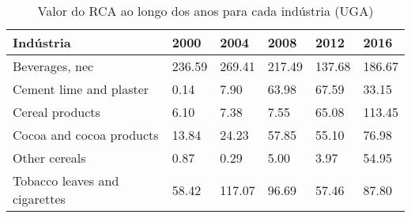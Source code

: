 \begin{table}
\centering
\caption{Valor do RCA ao longo dos anos para cada indústria (UGA)}
\label{tab:ex3-tempo-UGA}
\begin{tabular}{p{6cm}p{1.5cm}p{1.5cm}p{1.5cm}p{1.5cm}p{1.5cm}}
\toprule
                    Indústria &   2000 &   2004 &   2008 &   2012 &   2016 \\
\midrule
               Beverages, nec & 236.59 & 269.41 & 217.49 & 137.68 & 186.67 \\
      Cement lime and plaster &   0.14 &   7.90 &  63.98 &  67.59 &  33.15 \\
              Cereal products &   6.10 &   7.38 &   7.55 &  65.08 & 113.45 \\
     Cocoa and cocoa products &  13.84 &  24.23 &  57.85 &  55.10 &  76.98 \\
                Other cereals &   0.87 &   0.29 &   5.00 &   3.97 &  54.95 \\
Tobacco leaves and cigarettes &  58.42 & 117.07 &  96.69 &  57.46 &  87.80 \\
\bottomrule
\end{tabular}
\end{table}
